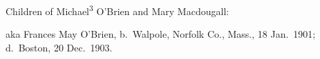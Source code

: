 \begin{KidsIntro}
	Children of Michael\textsuperscript{3} O'Brien and Mary Macdougall:
\end{KidsIntro}

\begin{Kids}
	 aka Frances May O'Brien, b.\ Walpole, Norfolk Co., Mass., 18 Jan.\ 1901;\cite{Frances4OBrienBirth} d.\ Boston, 20 Dec.\ 1903.\cite{Frances4OBrienDeath}
\end{Kids}